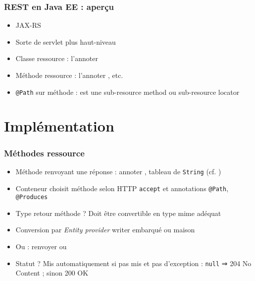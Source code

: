 \documentclass[english, french]{beamer}
\begin{document}
\begin{frame}
	\frametitle{REST en Java EE : aperçu}
	\begin{itemize}
		\item JAX-RS
		\item Sorte de servlet plus haut-niveau
		\item Classe ressource : l’annoter 
		\item Méthode ressource :  l’annoter , etc.
		\item \texttt{@Path} sur méthode : est une sub-resource method {\tiny ou sub-resource locator}
	\end{itemize}
\end{frame}

\section{Implémentation}
\begin{frame}
	\frametitle{Méthodes ressource}
	\begin{itemize}
		\item Méthode renvoyant une réponse : annoter , tableau de \texttt{String} (cf. )
		\item Conteneur choisit méthode selon HTTP \texttt{accept} et annotations \texttt{@Path}, \texttt{@Produces}
		\item Type retour méthode ? \pause Doit être convertible en type mime adéquat \pause
		\item Conversion par \emph{Entity provider} \og{}writer\fg{} embarqué ou maison
		\item Ou : renvoyer  {\tiny ou }
		\item Statut ? \pause Mis automatiquement si pas mis {\tiny et pas d’exception} : \texttt{null} ⇒ 204 No Content ; sinon 200 OK
	\end{itemize}
\end{frame}
\end{document}
